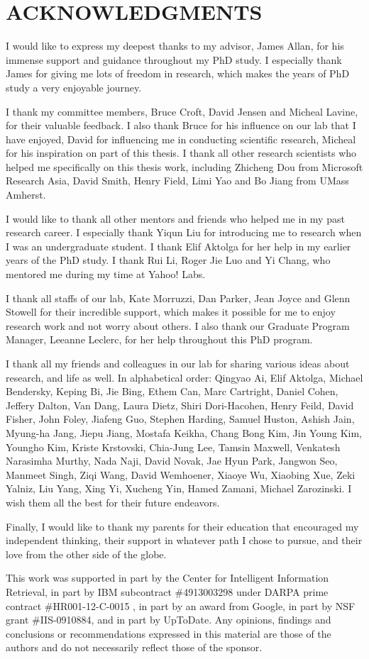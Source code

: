 \chapter{ACKNOWLEDGMENTS}
I would like to express my deepest thanks to my advisor, James Allan, for his immense support and guidance throughout my PhD study. I especially thank James for giving me lots of freedom in research, which makes the years of PhD study a very enjoyable journey. 

I thank my committee members, Bruce Croft, David Jensen and Micheal Lavine, for their valuable feedback. I also thank Bruce for his influence on our lab that I have enjoyed, David for influencing me in conducting scientific research, Micheal for his inspiration on part of this thesis. I thank all other research scientists who helped me specifically on this thesis work, including Zhicheng Dou from Microsoft Research Asia, David Smith, Henry Field, Limi Yao and Bo Jiang from UMass Amherst.

I would like to thank all other mentors and friends who helped me in my past research career. I especially thank Yiqun Liu for introducing me to research when I was an undergraduate student. I thank Elif Aktolga for her help in my earlier years of the PhD study. I thank Rui Li, Roger Jie Luo and Yi Chang, who mentored me during my time at Yahoo! Labs. 

I thank all staffs of our lab, Kate Morruzzi, Dan Parker, Jean Joyce and Glenn Stowell for their incredible support, which makes it possible for me to enjoy research work and not worry about others. I also thank our Graduate Program Manager, Leeanne Leclerc, for her help throughout this PhD program.

I thank all my friends and colleagues in our lab for sharing various ideas about research, and life as well. In alphabetical order: Qingyao Ai, Elif Aktolga, Michael Bendersky, Keping Bi, Jie Bing, Ethem Can, Marc Cartright, Daniel Cohen, Jeffery Dalton, Van Dang, Laura Dietz, Shiri Dori-Hacohen, Henry Feild, David Fisher, John Foley, Jiafeng Guo, Stephen Harding, Samuel Huston, Ashish Jain, Myung-ha Jang, Jiepu Jiang, Mostafa Keikha, Chang Bong Kim, Jin Young Kim, Youngho Kim, Kriste Krstovski, Chia-Jung Lee, Tamsin Maxwell, Venkatesh Narasimha Murthy, Nada Naji, David Novak, Jae Hyun Park, Jangwon Seo,  Manmeet Singh, Ziqi Wang, David Wemhoener, Xiaoye Wu, Xiaobing Xue, Zeki Yalniz, Liu Yang, Xing Yi, Xucheng Yin, Hamed Zamani, Michael Zarozinski. I wish them all the best for their future endeavors.

Finally, I would like to thank my parents for their education that encouraged my independent thinking, their support in whatever path I chose to pursue, and their love from the other side of the globe.

This work was supported in part by the Center for Intelligent Information Retrieval, in part by IBM subcontract \#4913003298 under DARPA prime contract \#HR001-12-C-0015 , in part by an award from Google, in part by NSF grant \#IIS-0910884, and in part by UpToDate. Any opinions, findings and conclusions or recommendations expressed in this material are those of the authors and do not necessarily reflect those of the sponsor.